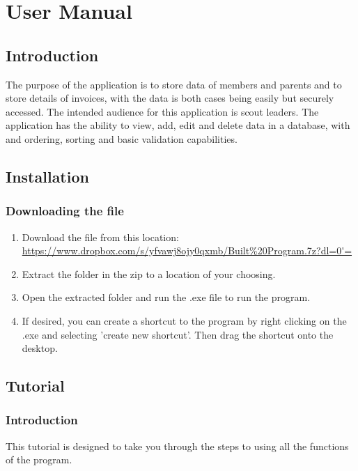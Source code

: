 \chapter{User Manual}

\section{Introduction}
The purpose of the application is to store data of members and parents and to store details of invoices, with the data is both cases being easily but securely accessed. The intended audience for this application is scout leaders. The application has the ability to view, add, edit and delete data in a database, with  and ordering, sorting and basic validation capabilities.

\section{Installation}

\subsection{Downloading the file}

\begin{enumerate}
	\item Download the file from this location: \url{https://www.dropbox.com/s/yfvawj8ojy0qxmb/Built\%20Program.7z?dl=0'=}
	\item Extract the folder in the zip to a location of your choosing.
	\item Open the extracted folder and  run the .exe file to run the program.
	\item If desired, you can create a shortcut to the program by right clicking on the .exe and selecting 'create new shortcut'. Then drag the shortcut onto the desktop.
\end{enumerate}

\section{Tutorial}

\subsection{Introduction}
This tutorial is designed to take you through the steps to using all the functions of the program. 


